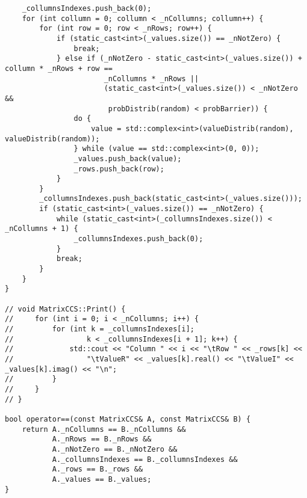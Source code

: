 \documentclass{report}
\begin{document}
\begin{lstlisting}
    _collumnsIndexes.push_back(0);
    for (int collumn = 0; collumn < _nCollumns; collumn++) {
        for (int row = 0; row < _nRows; row++) {
            if (static_cast<int>(_values.size()) == _nNotZero) {
                break;
            } else if (_nNotZero - static_cast<int>(_values.size()) + collumn * _nRows + row ==
                       _nCollumns * _nRows ||
                       (static_cast<int>(_values.size()) < _nNotZero &&
                        probDistrib(random) < probBarrier)) {
                do {
                    value = std::complex<int>(valueDistrib(random), valueDistrib(random));
                } while (value == std::complex<int>(0, 0));
                _values.push_back(value);
                _rows.push_back(row);
            }
        }
        _collumnsIndexes.push_back(static_cast<int>(_values.size()));
        if (static_cast<int>(_values.size()) == _nNotZero) {
            while (static_cast<int>(_collumnsIndexes.size()) < _nCollumns + 1) {
                _collumnsIndexes.push_back(0);
            }
            break;
        }
    }
}

// void MatrixCCS::Print() {
//     for (int i = 0; i < _nCollumns; i++) {
//         for (int k = _collumnsIndexes[i];
//                 k < _collumnsIndexes[i + 1]; k++) {
//             std::cout << "Column " << i << "\tRow " << _rows[k] <<
//                 "\tValueR" << _values[k].real() << "\tValueI" << _values[k].imag() << "\n";
//         }
//     }
// }

bool operator==(const MatrixCCS& A, const MatrixCCS& B) {
    return A._nCollumns == B._nCollumns &&
           A._nRows == B._nRows &&
           A._nNotZero == B._nNotZero &&
           A._collumnsIndexes == B._collumnsIndexes &&
           A._rows == B._rows &&
           A._values == B._values;
}

\end{lstlisting}
\end{document}
